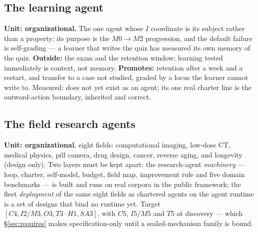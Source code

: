 \documentclass[11pt]{article}
\theoremstyle{definition}
\begin{document}
\subsection{The learning agent}

\textbf{Unit: organizational.} The one agent whose $I$ coordinate is its subject rather than a property: its purpose is the $M0\to M2$ progression, and the default failure is self-grading --- a learner that writes the quiz has measured its own memory of the quiz. \textbf{Outside:} the exam and the retention window; learning tested immediately is context, not memory. \textbf{Promotes:} retention after a week and a restart, and transfer to a case not studied, graded by a locus the learner cannot write to. Measured: does not yet exist as an agent; its one real charter line is the outward-action boundary, inherited and correct.

\subsection{The field research agents}\label{sec:research}

\textbf{Unit: organizational}, eight fields: computational imaging, low-dose CT, medical physics, pill camera, drug design, cancer, reverse aging, and longevity (design only). Two layers must be kept apart: the research-agent \emph{machinery} --- loop, charter, self-model, budget, field map, improvement rule and five domain benchmarks --- is built and runs on real corpora in the public framework; the fleet \emph{deployment} of the same eight fields as chartered agents on the agent runtime is a set of designs that bind no runtime yet. Target $[C4, I2/M3, O3, T3\cdot H1, SA3]$, with $C5$, $I5/M5$ and $T5$ at discovery --- which \S\ref{sec:requires} makes specification-only until a sealed-mechanism family is bound.
\end{document}
